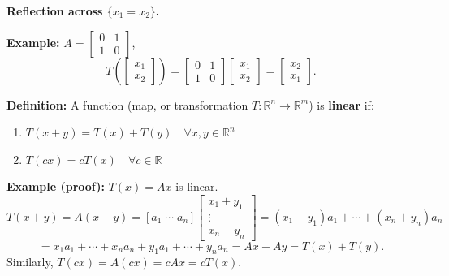 \documentclass{article}
\begin{document}
\bigskip

\textbf{Reflection across $\{x_1 = x_2\}$.}

\medskip

\textbf{Example:} $A = \begin{bmatrix} 0 & 1 \\ 1 & 0 \end{bmatrix}$,
\[
T\left( \begin{bmatrix} x_1 \\ x_2 \end{bmatrix} \right) = \begin{bmatrix} 0 & 1 \\ 1 & 0 \end{bmatrix} \begin{bmatrix} x_1 \\ x_2 \end{bmatrix} = \begin{bmatrix} x_2 \\ x_1 \end{bmatrix}.
\]

\begin{center}
\end{center}

\newpage

\textbf{Definition:} A function (map, or transformation $T: \mathbb{R}^n \to \mathbb{R}^m$) is \textbf{linear} if:
\begin{enumerate}
\item[a)] $T(x+y) = T(x) + T(y) \quad \forall x, y \in \mathbb{R}^n$
\item[b)] $T(cx) = cT(x) \quad \forall c \in \mathbb{R}$
\end{enumerate}

\medskip

\textbf{Example (proof):} $T(x) = Ax$ is linear.
\[
T(x+y) = A(x+y) = [a_1 \; \cdots \; a_n] \begin{bmatrix} x_1+y_1 \\ \vdots \\ x_n+y_n \end{bmatrix}
= (x_1+y_1)a_1 + \cdots + (x_n+y_n)a_n
\]
\[
= x_1 a_1 + \cdots + x_n a_n + y_1 a_1 + \cdots + y_n a_n = Ax + Ay = T(x) + T(y).
\]
Similarly, $T(cx) = A(cx) = cAx = cT(x)$.
\end{document}
